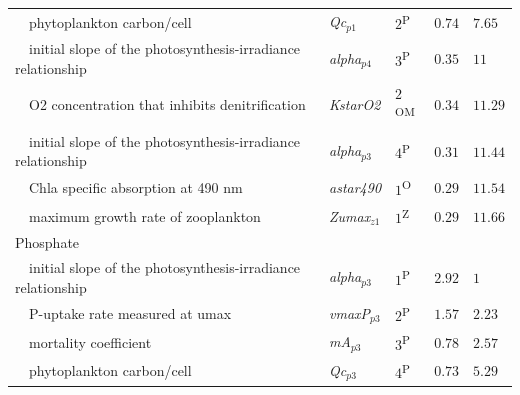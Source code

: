 \documentclass[letterpaper,12pt,oneside]{article}\usepackage[]{graphicx}\usepackage[]{color}
\begin{document}
\begin{table}[!tbp]
{\begin{center}
\begin{tabular}{lllll}
~~\scriptsize{phytoplankton carbon/cell}&\scriptsize{\textit{Qc$_{p1}$}}&$2$\textsuperscript{P}&$0.74$&$7.65$\tabularnewline
~~\scriptsize{initial slope of the photosynthesis-irradiance relationship}&\scriptsize{\textit{alpha$_{p4}$}}&$3$\textsuperscript{P}&$0.35$&$11$\tabularnewline
~~\scriptsize{O2 concentration that inhibits denitrification}&\scriptsize{\textit{KstarO2}}&$2$\textsuperscript{OM}&$0.34$&$11.29$\tabularnewline
~~\scriptsize{initial slope of the photosynthesis-irradiance relationship}&\scriptsize{\textit{alpha$_{p3}$}}&$4$\textsuperscript{P}&$0.31$&$11.44$\tabularnewline
~~\scriptsize{Chla specific absorption at 490 nm}&\scriptsize{\textit{astar490}}&$1$\textsuperscript{O}&$0.29$&$11.54$\tabularnewline
~~\scriptsize{maximum growth rate of zooplankton}&\scriptsize{\textit{Zumax$_{z1}$}}&$1$\textsuperscript{Z}&$0.29$&$11.66$\tabularnewline
\hline
{Phosphate}&&&&\tabularnewline
~~\scriptsize{initial slope of the photosynthesis-irradiance relationship}&\scriptsize{\textit{alpha$_{p3}$}}&$1$\textsuperscript{P}&$2.92$&$1$\tabularnewline
~~\scriptsize{P-uptake rate measured at umax}&\scriptsize{\textit{vmaxP$_{p3}$}}&$2$\textsuperscript{P}&$1.57$&$2.23$\tabularnewline
~~\scriptsize{mortality coefficient}&\scriptsize{\textit{mA$_{p3}$}}&$3$\textsuperscript{P}&$0.78$&$2.57$\tabularnewline
~~\scriptsize{phytoplankton carbon/cell}&\scriptsize{\textit{Qc$_{p3}$}}&$4$\textsuperscript{P}&$0.73$&$5.29$\tabularnewline
\hline
\end{tabular}\end{center}}

\end{table}

\clearpage

\end{document}

